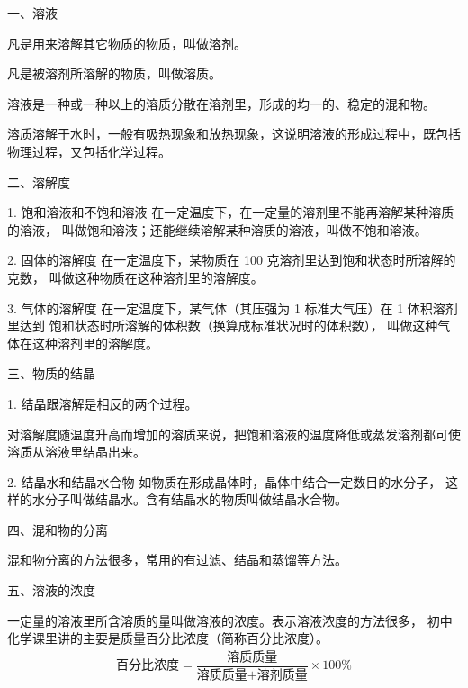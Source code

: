 \xiaojie

一、溶液

凡是用来溶解其它物质的物质，叫做溶剂。

凡是被溶剂所溶解的物质，叫做溶质。

溶液是一种或一种以上的溶质分散在溶剂里，形成的均一的、稳定的混和物。

溶质溶解于水时，一般有吸热现象和放热现象，这说明溶液的形成过程中，既包括物理过程，又包括化学过程。


二、溶解度

1. 饱和溶液和不饱和溶液 \quad 在一定温度下，在一定量的溶剂里不能再溶解某种溶质的溶液，
叫做饱和溶液；还能继续溶解某种溶质的溶液，叫做不饱和溶液。

2. 固体的溶解度 \quad 在一定温度下，某物质在 100 克溶剂里达到饱和状态时所溶解的克数，
叫做这种物质在这种溶剂里的溶解度。

3. 气体的溶解度 \quad 在一定温度下，某气体（其压强为 1 标准大气压）在 1 体积溶剂里达到
饱和状态时所溶解的体积数（换算成标准状况时的体积数）， 叫做这种气体在这种溶剂里的溶解度。


三、物质的结晶

1. 结晶跟溶解是相反的两个过程。
\begin{fangchengshi}
\end{fangchengshi}

对溶解度随温度升高而增加的溶质来说，把饱和溶液的温度降低或蒸发溶剂都可使溶质从溶液里结晶出来。


2. 结晶水和结晶水合物 \quad 如物质在形成晶体时，晶体中结合一定数目的水分子，
这样的水分子叫做结晶水。含有结晶水的物质叫做结晶水合物。


四、混和物的分离

混和物分离的方法很多，常用的有过滤、结晶和蒸馏等方法。


五、溶液的浓度

一定量的溶液里所含溶质的量叫做溶液的浓度。表示溶液浓度的方法很多，
初中化学课里讲的主要是质量百分比浓度（简称百分比浓度）。
\begin{gather*}
    \text{百分比浓度} = \dfrac{\text{溶质质量}}{\text{溶质质量} + \text{溶剂质量}} \times 100\%
\end{gather*}


